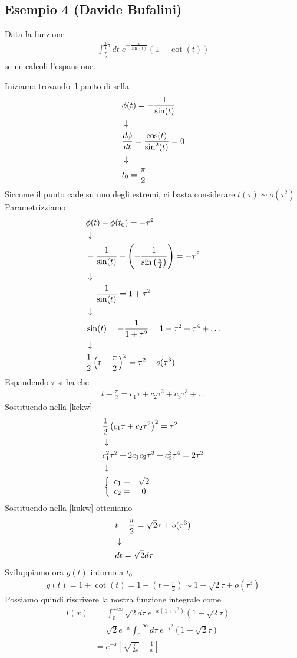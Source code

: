 \newpage

\subsection{Esempio 4 (Davide Bufalini)}

Data la funzione
\begin{align}
	\int_{\frac{\pi}{2}}^{\frac{3}{4}\pi} dt \; e^{-\frac{x}{\sin(t)}} (1 + \cot (t))
\end{align}
se ne calcoli l'espansione.

Iniziamo trovando il punto di sella
\begin{align}
	&\phi(t) = -\frac{1}{\sin(t)}\\ &\downarrow \nonumber \\
	&\frac{d\phi}{dt} = \frac{\cos (t)}{\sin^2 (t)} = 0 \\ &\downarrow \nonumber \\
	& t_0 = \frac{\pi}{2}
\end{align}
Siccome il punto cade su uno degli estremi, ci basta considerare $t(\tau) \sim o(\tau^2)$
Parametrizziamo
\begin{align}
	&\phi(t) - \phi(t_0) = -\tau^2\\ &\downarrow \nonumber \\
	&-\frac{1}{\sin (t)}-\left(-\frac{1}{\sin \left( \frac{\pi}{2}\right)}\right) = -\tau^2 \nonumber \\ &\downarrow \nonumber \\
	&-\frac{1}{\sin (t)} = 1 +\tau^2\nonumber \\ &\downarrow \nonumber \\
	&\sin (t) = -\frac{1}{1+\tau^2} = 1 - \tau^2 + \tau^4 + \dots \nonumber \\ &\downarrow \nonumber \\
	&\frac{1}{2} \left( t -\frac{\pi}{2} \right)^2 = \tau^2 + o(\tau^3) \label{kekw}
\end{align}
Espandendo $\tau$ si ha che
\begin{align}
	 t -\frac{\pi}{2} = c_1 \tau + c_2 \tau^2 + c_3 \tau^3 + \dots \label{kukw}
\end{align}
Sostituendo nella \ref{kekw}
\begin{align}
&\frac{1}{2} \left( c_1 \tau + c_2 \tau^2 \right)^2 = \tau^2 \\ &\downarrow \nonumber \\
&c_1^2 \tau^2 + 2c_1 c_2 \tau^3 + c_2^2 \tau^4 = 2 \tau^2\nonumber \\ &\downarrow \nonumber \\
&\left\{ \begin{array}{cc} c_1 = &\sqrt{2}\\ c_2 = &0 \end{array} \right.
\end{align}
Sostituendo nella \ref{kukw} otteniamo
\begin{align}
	&t -\frac{\pi}{2} = \sqrt{2}\tau + o(\tau^3)	\\ &\downarrow \nonumber \\
	&dt = \sqrt{2}d\tau
\end{align}
Sviluppiamo ora $g(t)$ intorno a $t_0$
\begin{align}
	g(t) = 1 + \cot(t) = 1 - \left( t -\frac{\pi}{2} \right) \sim 1 - \sqrt{2}\tau +o(\tau^3)
\end{align}
Possiamo quindi riscrivere la nostra funzione integrale come
\begin{align}
	I(x) &= \int_{0}^{+\infty} \sqrt{2} d\tau \; e^{-x(1+\tau^2)}(1 - \sqrt{2}\tau) = \nonumber\\
	&= \sqrt{2}e^{-x} \int_{0}^{+\infty}  d\tau \; e^{-\tau^2}(1 - \sqrt{2}\tau) = \nonumber\\
	&=e^{-x} \left[ \sqrt{\frac{\pi}{2x}} - \frac{1}{x} \right]
\end{align}



